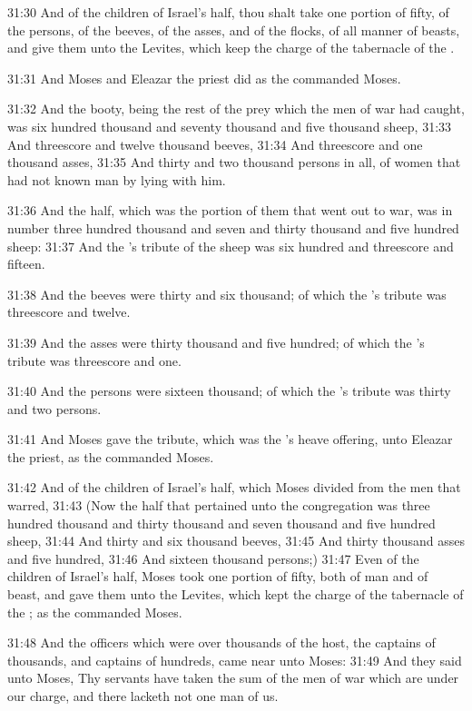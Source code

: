 31:30 And of the children of Israel's half, thou shalt take one
portion of fifty, of the persons, of the beeves, of the asses, and of
the flocks, of all manner of beasts, and give them unto the Levites,
which keep the charge of the tabernacle of the \LORD.

31:31 And Moses and Eleazar the priest did as the \LORD commanded
Moses.

31:32 And the booty, being the rest of the prey which the men of war
had caught, was six hundred thousand and seventy thousand and five
thousand sheep, 31:33 And threescore and twelve thousand beeves, 31:34
And threescore and one thousand asses, 31:35 And thirty and two
thousand persons in all, of women that had not known man by lying with
him.

31:36 And the half, which was the portion of them that went out to
war, was in number three hundred thousand and seven and thirty
thousand and five hundred sheep: 31:37 And the \LORD's tribute of the
sheep was six hundred and threescore and fifteen.

31:38 And the beeves were thirty and six thousand; of which the \LORD's
tribute was threescore and twelve.

31:39 And the asses were thirty thousand and five hundred; of which
the \LORD's tribute was threescore and one.

31:40 And the persons were sixteen thousand; of which the \LORD's
tribute was thirty and two persons.

31:41 And Moses gave the tribute, which was the \LORD's heave offering,
unto Eleazar the priest, as the \LORD commanded Moses.

31:42 And of the children of Israel's half, which Moses divided from
the men that warred, 31:43 (Now the half that pertained unto the
congregation was three hundred thousand and thirty thousand and seven
thousand and five hundred sheep, 31:44 And thirty and six thousand
beeves, 31:45 And thirty thousand asses and five hundred, 31:46 And
sixteen thousand persons;) 31:47 Even of the children of Israel's
half, Moses took one portion of fifty, both of man and of beast, and
gave them unto the Levites, which kept the charge of the tabernacle of
the \LORD; as the \LORD commanded Moses.

31:48 And the officers which were over thousands of the host, the
captains of thousands, and captains of hundreds, came near unto Moses:
31:49 And they said unto Moses, Thy servants have taken the sum of the
men of war which are under our charge, and there lacketh not one man
of us.

